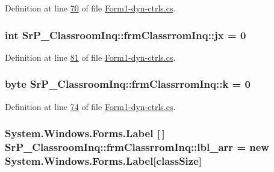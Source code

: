 \-Definition at line \hyperlink{_form1-dyn-ctrls_8cs_source_l00070}{70} of file \hyperlink{_form1-dyn-ctrls_8cs_source}{\-Form1-\/dyn-\/ctrls.\-cs}.

\hypertarget{class_sr_p___classroom_inq_1_1frm_classrrom_inq_a6206484c9b4d5d7558f8904cad77cded}{
\subsubsection[{jx}]{\setlength{\rightskip}{0pt plus 5cm}int {\bf \-Sr\-P\-\_\-\-Classroom\-Inq\-::frm\-Classrrom\-Inq\-::jx} = 0}}
\label{class_sr_p___classroom_inq_1_1frm_classrrom_inq_a6206484c9b4d5d7558f8904cad77cded}


\-Definition at line \hyperlink{_form1-dyn-ctrls_8cs_source_l00081}{81} of file \hyperlink{_form1-dyn-ctrls_8cs_source}{\-Form1-\/dyn-\/ctrls.\-cs}.

\hypertarget{class_sr_p___classroom_inq_1_1frm_classrrom_inq_ad13cb123edd99d95b379613aad0f2a39}{
\subsubsection[{k}]{\setlength{\rightskip}{0pt plus 5cm}byte {\bf \-Sr\-P\-\_\-\-Classroom\-Inq\-::frm\-Classrrom\-Inq\-::k} = 0}}
\label{class_sr_p___classroom_inq_1_1frm_classrrom_inq_ad13cb123edd99d95b379613aad0f2a39}


\-Definition at line \hyperlink{_form1-dyn-ctrls_8cs_source_l00074}{74} of file \hyperlink{_form1-dyn-ctrls_8cs_source}{\-Form1-\/dyn-\/ctrls.\-cs}.

\hypertarget{class_sr_p___classroom_inq_1_1frm_classrrom_inq_a7f0a5f5fff7a87e841b2793f89dcd997}{
\subsubsection[{lbl\-\_\-arr}]{\setlength{\rightskip}{0pt plus 5cm}\-System.\-Windows.\-Forms.\-Label \mbox{[}$\,$\mbox{]} {\bf \-Sr\-P\-\_\-\-Classroom\-Inq\-::frm\-Classrrom\-Inq\-::lbl\-\_\-arr} = new \-System.\-Windows.\-Forms.\-Label\mbox{[}{\bf class\-Size}\mbox{]}}}
\label{class_sr_p___classroom_inq_1_1frm_classrrom_inq_a7f0a5f5fff7a87e841b2793f89dcd997}


